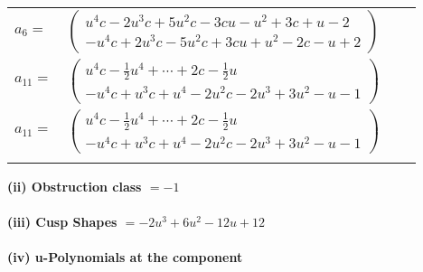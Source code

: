 \documentclass[1p]{elsarticle_modified}
\theoremstyle{definition}
\begin{document}
\begin{tabular}{m{7pt} m{180pt} m{7pt} m{180pt} }
\flushright $a_{6}=$&$\begin{pmatrix}u^4 c-2 u^3 c+5 u^2 c-3 c u- u^2+3 c+u-2\\- u^4 c+2 u^3 c-5 u^2 c+3 c u+u^2-2 c- u+2\end{pmatrix}$ \\
\flushright $a_{11}=$&$\begin{pmatrix}u^4 c-\frac{1}{2} u^4+\cdots+2 c-\frac{1}{2} u\\- u^4 c+u^3 c+u^4-2 u^2 c-2 u^3+3 u^2- u-1\end{pmatrix}$\\ \flushright $a_{11}=$&$\begin{pmatrix}u^4 c-\frac{1}{2} u^4+\cdots+2 c-\frac{1}{2} u\\- u^4 c+u^3 c+u^4-2 u^2 c-2 u^3+3 u^2- u-1\end{pmatrix}$\\&\end{tabular}
\flushleft \textbf{(ii) Obstruction class $= -1$}\\~\\
\flushleft \textbf{(iii) Cusp Shapes $= -2 u^3+6 u^2-12 u+12$}\\~\\
\newpage\renewcommand{\arraystretch}{1}
\flushleft \textbf{(iv) u-Polynomials at the component}\newline \\
\end{document}
